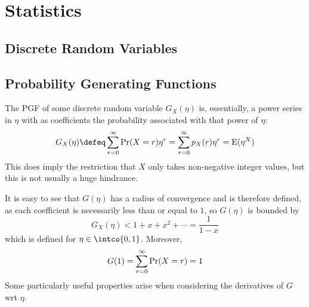 \section{Statistics}

\subsection{Discrete Random Variables}

\subsection{Probability Generating Functions}

The PGF of some discrete random variable \(G_X(\eta)\) is, essentially, a power
series in \(\eta\) with as coefficients the probability associated with that
power of \(\eta\):
\begin{equation*}
 G_X(\eta) \defeq \sum_{r = 0}^\infty \Prob(X = r)\eta^r
     = \sum_{r = 0}^\infty p_X(r)\eta^r
     = \Expect(\eta^X)
\end{equation*}
This does imply the restriction that \(X\) only takes
non-negative integer values, but this is not usually a huge hindrance.

It is easy to see that \(G(\eta)\) has a radius of convergence and is therefore
defined, as each coefficient is necessarily less than or equal to \(1\), so
\(G(\eta)\) is bounded by
\begin{equation*}
 G_X(\eta) < 1 + x + x^2 + \dotsb = \frac 1{1 - x}
\end{equation*}
which is defined for \(\eta \in \intco{0, 1}\). Moreover,
\begin{equation*}
 G(1) = \sum_{r = 0}^\infty \operatorname{Pr}(X = r) = 1
\end{equation*}
Some particularly useful properties arise when considering the derivatives of
\(G\) wrt \(\eta\).


